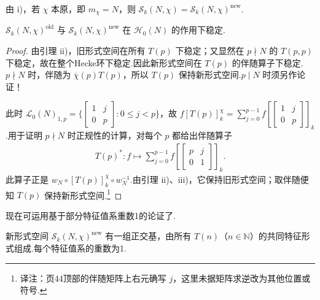 \begin{remark*}

由 i)，若 $\chi$ 本原，即 $m_\chi=N$，则 $\mathcal S_k(N,\chi)=\mathcal S_k(N,\chi)^{\mathrm{new}}$.

\end{remark*}

\begin{corollary*}

$\mathcal S_k(N,\chi)^{\mathrm{old}}$ 与 $\mathcal S_k(N,\chi)^{\mathrm{new}}$ 在 $\mathcal H_0(N)$ 的作用下稳定.

\end{corollary*}

\begin{proof}

由引理 ii)，旧形式空间在所有 $T(p)$ 下稳定；又显然在 $p\nmid N$ 的 $T(p,p)$ 下稳定，故在整个Hecke环下稳定.因此新形式空间在 $T(p)$ 的伴随算子下稳定.$p\nmid N$ 时，伴随为 $\overline\chi(p)T(p)$，所以 $T(p)$ 保持新形式空间.$p\mid N$ 时须另作论证！

此时 $\mathcal L_0(N)_{1,p}=\{\left[\begin{smallmatrix}1&j\\0&p\end{smallmatrix}\right]:0\le j<p\}$，故 $f[T(p)]_k^\chi=\sum_{j=0}^{p-1}f[\left[\begin{smallmatrix}1&j\\0&p\end{smallmatrix}\right]]_k$.用于证明 $p\nmid N$ 时正规性的计算，对每个 $p$ 都给出伴随算子
\begin{align*}
T(p)^*:f\longmapsto\sum_{j=0}^{p-1}f[\left[\begin{smallmatrix}p&j\\0&1\end{smallmatrix}\right]]_k.
\end{align*}
此算子正是 $w_N\circ[T(p)]_k^{\overline\chi}\circ w_N^{-1}$.由引理 ii)、iii)，它保持旧形式空间；取伴随便知 $T(p)$ 保持新形式空间.\footnote{译注：页44顶部的伴随矩阵上右元确写 $j$，这里未据矩阵求逆改为其他位置或符号.}

\end{proof}

现在可运用基于部分特征值系重数1的论证了.

\begin{corollary*}

新形式空间 $\mathcal S_k(N,\chi)^{\mathrm{new}}$ 有一组正交基，由所有 $T(n)$（$n\in\mathbb N$）的共同特征形式组成.每个特征值系的重数为1.

\end{corollary*}

